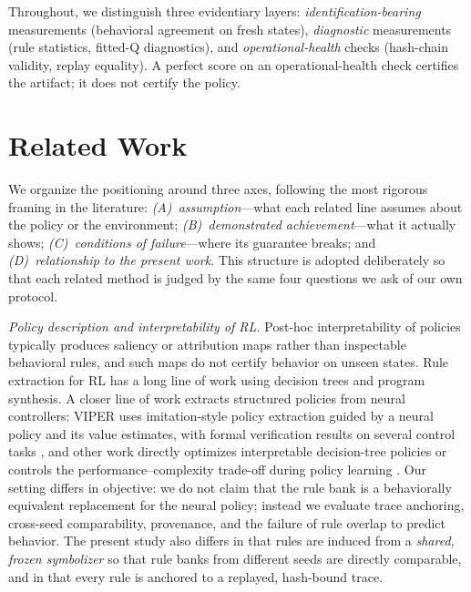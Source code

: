 \documentclass[11pt]{article}
\begin{document}
Throughout, we distinguish three evidentiary layers: \emph{identification-bearing} measurements
(behavioral agreement on fresh states), \emph{diagnostic} measurements (rule statistics, fitted-Q
diagnostics), and \emph{operational-health} checks (hash-chain validity, replay equality). A perfect
score on an operational-health check certifies the artifact; it does not certify the policy.

\section{Related Work}
\label{sec:related}

We organize the positioning around three axes, following the most rigorous framing in the literature:
\emph{(A)~assumption}---what each related line assumes about the policy or the environment;
\emph{(B)~demonstrated achievement}---what it actually shows; \emph{(C)~conditions of failure}---where
its guarantee breaks; and \emph{(D)~relationship to the present work}. This structure is adopted
deliberately so that each related method is judged by the same four questions we ask of our own
protocol.

\emph{Policy description and interpretability of RL.} Post-hoc interpretability of policies
typically produces saliency or attribution maps rather than inspectable behavioral rules, and such
maps do not certify behavior on unseen states. Rule extraction for RL has a long line of work using
decision trees and program synthesis. A closer line of work extracts structured policies from neural
controllers: VIPER uses imitation-style policy extraction guided by a neural policy and its value
estimates, with formal verification results on several control tasks \cite{bastani2018viper}, and
other work directly optimizes interpretable decision-tree policies or controls the
performance--complexity trade-off during policy learning \cite{roth2019conservative}. Our setting
differs in objective: we do not claim that the rule bank is a behaviorally equivalent replacement for
the neural policy; instead we evaluate trace anchoring, cross-seed comparability, provenance, and the
failure of rule overlap to predict behavior. The present study also differs in that rules are induced
from a \emph{shared, frozen symbolizer} so that rule banks from different seeds are directly
comparable, and in that every rule is anchored to a replayed, hash-bound trace.
\end{document}
